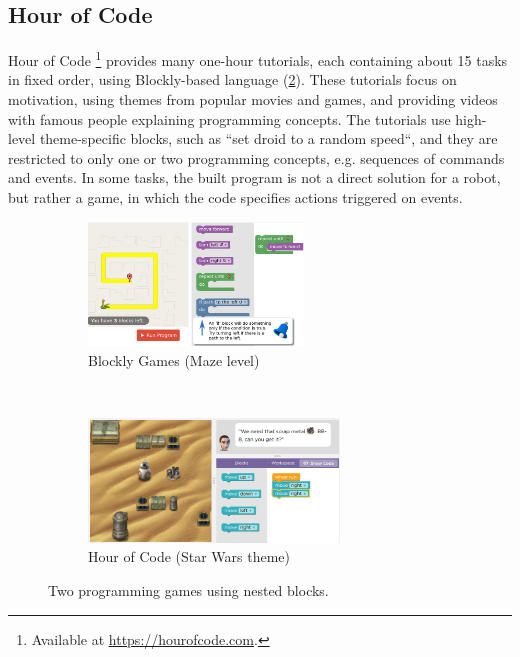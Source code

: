 
\subsection{Hour of Code}
\label{sec:hoc}
Hour of Code%
\footnote{Available at \url{https://hourofcode.com}.}
provides many one-hour tutorials, each containing about 15 tasks in fixed order,
using Blockly-based language
(\cref{fig:hoc}).
These tutorials focus on motivation, using themes from popular movies and
games, and providing videos with famous people explaining programming concepts.
The tutorials use high-level theme-specific blocks, such as ``set droid to a
random speed``, and they are restricted to only one or two programming
concepts, e.g. sequences of commands and events.
In some tasks, the built program is not a direct solution for a robot,
but rather a game, in which the code specifies actions triggered on events.



\begin{figure}[htb]
\centering
\begin{subfigure}[t]{0.43\textwidth}
\centering
\includegraphics[height=33mm]{img/blockly-nested}
\caption{Blockly Games (Maze level)}
\label{fig:blockly-games}
\end{subfigure}%
~
\begin{subfigure}[t]{0.57\textwidth}
\centering
\includegraphics[height=33mm]{img/hour-of-code-sw}
\caption{Hour of Code (Star Wars theme)}
\label{fig:hoc}
\end{subfigure}
\caption{Two programming games using nested blocks.}
\label{fig:blockly-hoc}
\end{figure}





